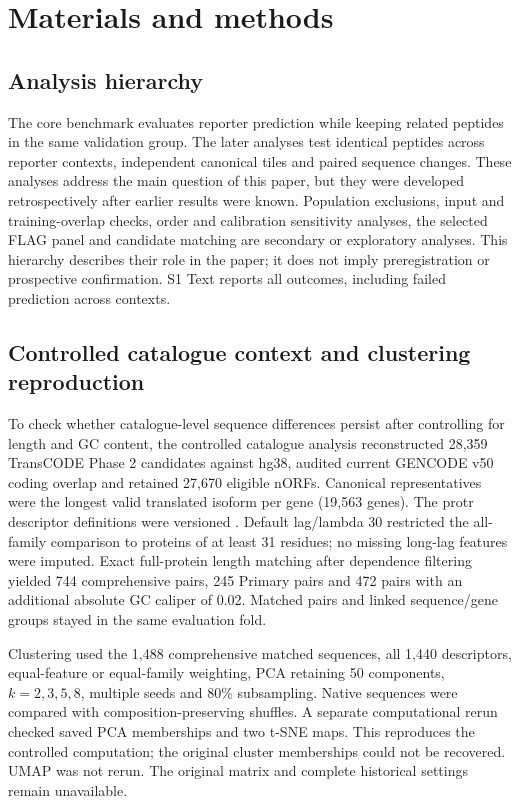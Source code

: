 \documentclass[11pt,a4paper]{article}
\begin{document}
\section{Materials and methods}
\subsection{Analysis hierarchy}
The core benchmark evaluates reporter prediction while keeping related peptides in the same validation group. The later analyses test identical peptides across reporter contexts, independent canonical tiles and paired sequence changes. These analyses address the main question of this paper, but they were developed retrospectively after earlier results were known. Population exclusions, input and training-overlap checks, order and calibration sensitivity analyses, the selected FLAG panel and candidate matching are secondary or exploratory analyses. This hierarchy describes their role in the paper; it does not imply preregistration or prospective confirmation. S1 Text reports all outcomes, including failed prediction across contexts.


\subsection{Controlled catalogue context and clustering reproduction}
To check whether catalogue-level sequence differences persist after
controlling for length and GC content, the controlled catalogue analysis
reconstructed 28,359 TransCODE Phase 2 candidates against hg38, audited current GENCODE v50 coding overlap and
retained 27,670 eligible nORFs. Canonical representatives were the longest
valid translated isoform per gene (19,563 genes). The protr descriptor
definitions were versioned \cite{xiao}. Default lag/lambda 30 restricted the
all-family comparison to proteins of at least 31 residues; no missing
long-lag features were imputed. Exact full-protein length matching after
dependence filtering yielded 744 comprehensive pairs, 245 Primary pairs and
472 pairs with an additional absolute GC caliper of 0.02. Matched pairs and
linked sequence/gene groups stayed in the same evaluation fold.

Clustering used the 1,488 comprehensive matched sequences, all 1,440
descriptors, equal-feature or equal-family weighting, PCA retaining 50
components, $k=2,3,5,8$, multiple seeds and 80\% subsampling. Native sequences
were compared with composition-preserving shuffles. A separate computational
rerun checked saved PCA memberships and two t-SNE maps. This reproduces the
controlled computation; the original cluster memberships could not be recovered. UMAP was not
rerun. The original matrix and complete historical settings remain unavailable.
\end{document}
